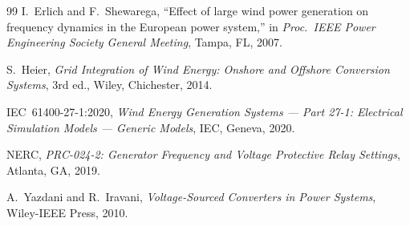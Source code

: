 \documentclass[11pt, a4paper]{article}
\begin{document}
\begin{thebibliography}{99}
I.~Erlich and F.~Shewarega,
``Effect of large wind power generation on frequency dynamics in the European
power system,''
in \emph{Proc.\ IEEE Power Engineering Society General Meeting}, Tampa, FL,
2007.

S.~Heier,
\emph{Grid Integration of Wind Energy: Onshore and Offshore Conversion Systems},
3rd ed., Wiley, Chichester, 2014.

IEC~61400-27-1:2020,
\emph{Wind Energy Generation Systems --- Part 27-1: Electrical Simulation
Models --- Generic Models}, IEC, Geneva, 2020.

NERC, \emph{PRC-024-2: Generator Frequency and Voltage Protective Relay
Settings}, Atlanta, GA, 2019.

A.~Yazdani and R.~Iravani,
\emph{Voltage-Sourced Converters in Power Systems}, Wiley-IEEE Press, 2010.
\end{thebibliography}
\end{document}
